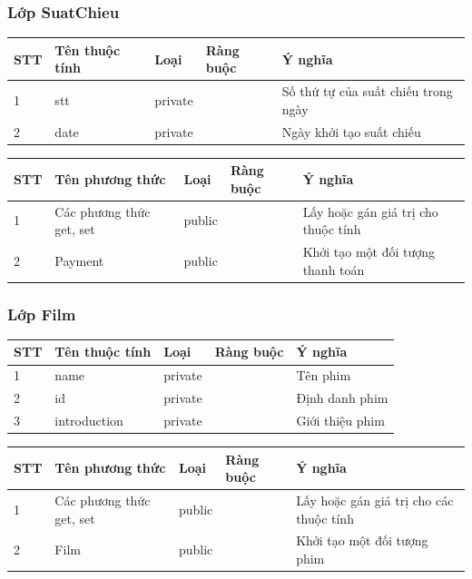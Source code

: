 \documentclass[a4paper, 12pt]{article}
\begin{document}
\subsubsection{Lớp SuatChieu}
\begin{table}[H]
\centering
\begin{tabular}{|l|l|l|l|l|}
\hline
STT & Tên thuộc tính & Loại    & Ràng buộc & Ý nghĩa                             \\ \hline
1   & stt            & private &           & Số thứ tự của suất chiếu trong ngày \\ \hline
2   & date           & private &           & Ngày khởi tạo suất chiếu            \\ \hline
\end{tabular}
\end{table}
\begin{table}[H]
\centering
\begin{tabular}{|l|l|l|l|l|}
\hline
STT & Tên phương thức          & Loại   & Ràng buộc & Ý nghĩa                             \\ \hline
1   & Các phương thức get, set & public &           & Lấy hoặc gán giá trị cho thuộc tính \\ \hline
2   & Payment                  & public &           & Khởi tạo một đối tượng thanh toán   \\ \hline
\end{tabular}
\end{table}

\subsubsection{Lớp Film}
\begin{table}[H]
\centering
\begin{tabular}{|l|l|l|l|l|}
\hline
STT & Tên thuộc tính & Loại    & Ràng buộc & Ý nghĩa                	\\ \hline
1   & name           & private &           & Tên phim 					\\ \hline
2   & id             & private &           & Định danh phim           	\\ \hline
3   & introduction   & private &           & Giới thiệu phim          	\\ \hline
\end{tabular}
\end{table}
\begin{table}[H]
\centering
\begin{tabular}{|l|l|l|l|l|}
\hline
STT & Tên phương thức          & Loại   & Ràng buộc & Ý nghĩa                                 \\ \hline
1   & Các phương thức get, set & public &           & Lấy hoặc gán giá trị cho các thuộc tính \\ \hline
2   & Film                     & public &           & Khởi tạo một đối tượng phim             \\ \hline
\end{tabular}
\end{table}
\end{document}
